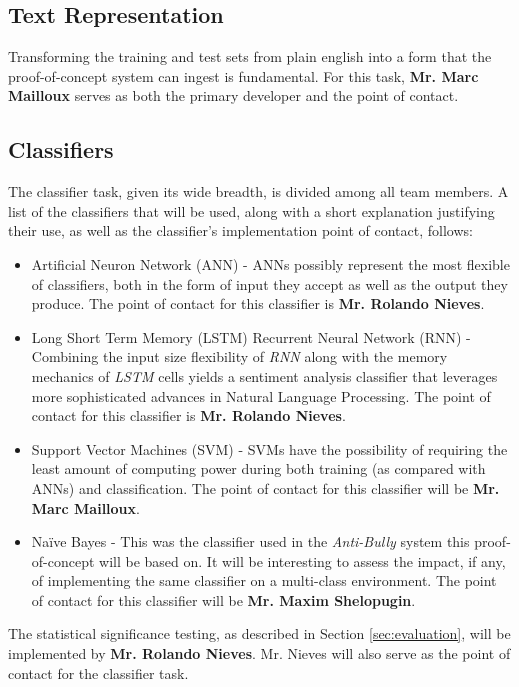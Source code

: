 \documentclass[conference]{sig-alternate-05-2015}
\begin{document}
\subsection{Text Representation}\label{sec:tokenization_task}
Transforming the training and test sets from plain english into a form that the
proof-of-concept system can ingest is fundamental. For this task,
\textbf{Mr. Marc Mailloux} serves as both the primary developer and the
point of contact.

\subsection{Classifiers}\label{sec:classifier_task}
The classifier task, given its wide breadth, is divided among all team
members. A list of the classifiers that will be used, along with a short
explanation justifying their use, as well as the classifier's implementation
point of contact, follows:
\begin{itemize}
  \item Artificial Neuron Network (ANN) - ANNs possibly represent
  the most flexible of classifiers, both in the form of input they accept as
  well as the output they produce. The point of contact for this classifier is
  \textbf{Mr. Rolando Nieves}.
  \item Long Short Term Memory (LSTM) Recurrent Neural Network (RNN) - Combining
  the input size flexibility of \textit{RNN} along with the memory mechanics of
  \textit{LSTM} cells yields a sentiment analysis classifier that leverages
  more sophisticated advances in Natural Language Processing. The point of
  contact for this classifier is \textbf{Mr. Rolando Nieves}.
  \item Support Vector Machines (SVM) - SVMs have the possibility of requiring
  the least amount of computing power during both training (as compared with
  ANNs) and classification. The point of contact for this classifier will be
  \textbf{Mr. Marc Mailloux}.
  \item Na\"{i}ve Bayes - This was the classifier used in the \textit{Anti-Bully}
  system this proof-of-concept will be based on. It will be interesting to
  assess the impact, if any, of implementing the same classifier on a
  multi-class environment. The point of contact for this classifier will be
  \textbf{Mr. Maxim Shelopugin}.
\end{itemize}

The statistical significance testing, as described in Section
\ref{sec:evaluation}, will be implemented by \textbf{Mr. Rolando Nieves}. Mr.
Nieves will also serve as the point of contact for the classifier task.
\end{document}
